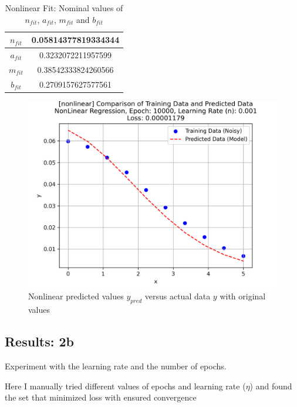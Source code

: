 \documentclass[letterpaper, 10 pt, conference]{ieeeconf}  %
\begin{document}
\begin{table}[h]
   \centering
   \caption{Nonlinear Fit: Nominal values of $n_{fit}$, $a_{fit}$, $m_{fit}$ and $b_{fit}$}
   \label{tab:NonLin_Nominal_namb}
   \begin{tabular}{|c|c|}
      \hline
      $n_{fit}$ & 0.05814377819334344 \\
      \hline
      $a_{fit}$ & 0.3232072211957599 \\
      \hline
      $m_{fit}$ & 0.38542333824260566 \\
      \hline
      $b_{fit}$ & 0.2709157627577561 \\
      \hline
   \end{tabular}
\end{table}

\begin{figure}[h!]
   \centering
   \includegraphics[width=0.8\linewidth]{../Figures/nonlinear_regression_e_10000_n_0.001.png}
   \caption{Nonlinear predicted values $y_{pred}$ versus actual data $y$ with original values }
   \label{fig:NonLin_a}
\end{figure}



\subsection{Results: 2b}
Experiment with the learning rate and the number of epochs.

Here I manually tried different values of epochs and learning rate ($\eta$) and found the set that minimized loss with ensured convergence
\end{document}
